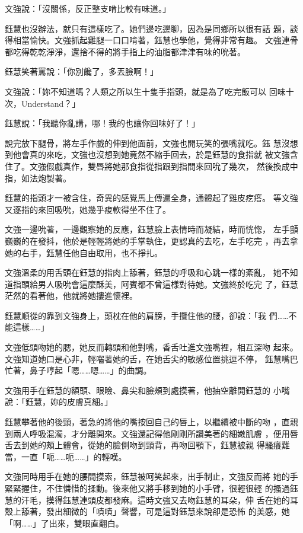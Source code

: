 文強說：「沒關係，反正整支啃比較有味道。」

鈺慧也沒辦法，就只有這樣吃了。她們邊吃邊聊，因為是同鄉所以很有話
題，談得相當愉快。文強抓起雞腿一口口啃著，鈺慧也學他，覺得非常有趣。
文強連骨都吃得乾乾淨淨，還捨不得的將手指上的油脂都津津有味的吮著。

鈺慧笑著罵說：「你別饞了，多丟臉啊！」

文強說：「妳不知道嗎？人類之所以生十隻手指頭，就是為了吃完飯可以
回味十次，Understand？」

鈺慧說：「我聽你亂講，哪！我的也讓你回味好了！」

說完放下腿骨，將左手作戲的伸到他面前，文強也開玩笑的張嘴就吃。鈺
慧沒想到他會真的來吃，文強也沒想到她竟然不縮手回去，於是鈺慧的食指就
被文強含住了。文強假戲真作，雙唇將她那食指從指跟到指間來回吮了幾次，
然後換成中指，如法炮製著。

鈺慧的指頭才一被含住，奇異的感覺馬上傳遍全身，通體起了雞皮疙瘩。
等文強又逐指的來回吸吮，她幾乎痠軟得坐不住了。

文強一邊吮著，一邊觀察她的反應，鈺慧臉上表情時而凝結，時而恍惚，
左手顫巍巍的在發抖，他於是輕輕將她的手掌執住，更認真的去吃，左手吃完
，再去拿她的右手，鈺慧任他自由取用，也不掙扎。

文強溫柔的用舌頭在鈺慧的指肉上舔著，鈺慧的呼吸和心跳一樣的紊亂，
她不知道指頭給男人吸吮會這麼酥美，阿賓都不曾這樣對待她。文強終於吃完
了，鈺慧茫然的看著他，他就將她摟進懷裡。

鈺慧順從的靠到文強身上，頭枕在他的肩膀，手攬住他的腰，卻說：「我
們……不能這樣……」

文強低頭吻她的腮，她反而轉頭和他對嘴，香舌吐進文強嘴裡，相互深吻
起來。文強知道她口是心非，輕囓著她的舌，在她舌尖的敏感位置挑逗不停，
鈺慧嘴巴忙著，鼻子哼起「嗯……嗯……」的曲調。

文強用手在鈺慧的額頭、眼瞼、鼻尖和臉頰到處摸著，他抽空離開鈺慧的
小嘴說：「鈺慧，妳的皮膚真細。」

鈺慧攀著他的後頸，著急的將他的嘴按回自己的唇上，以繼續被中斷的吻
，直親到兩人呼吸混濁，才分離開來。文強還記得他剛剛所讚美著的細嫩肌膚
，便用唇舌去到她的頰上體會，從她的臉側吻到頸背，再吻回顎下，鈺慧被親
得騷癢難當，一直「呃……呃……」的輕嘆。

文強同時用手在她的腰間摸索，鈺慧被呵笑起來，出手制止，文強反而將
她的手緊緊握住，不住憐惜的揉動。後來他又將手移到她的小手臂，很輕很輕
的搔過鈺慧的汗毛，摸得鈺慧連頭皮都發麻。這時文強又去吻鈺慧的耳朵，伸
舌在她的耳殼上舔著，發出細微的「嘖嘖」聲響，可是這對鈺慧來說卻是恐怖
的美感，她「啊……」了出來，雙眼直翻白。

